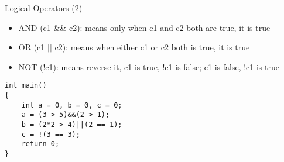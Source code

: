 \begin{frame}[fragile]{Logical Operators (2)}
\begin{itemize}
	\item {AND (c1 \&\& c2): means only when c1 and c2 both are true,  it is true}
	\item {OR (c1 $||$ c2): means when either c1 or c2 both is true,  it is true}
	\item {NOT (!c1): means reverse it, c1 is true, !c1 is false; c1 is false, !c1 is true}
\end{itemize}
\begin{lstlisting}
int main()
{
    int a = 0, b = 0, c = 0;
    a = (3 > 5)&&(2 > 1);
    b = (2*2 > 4)||(2 == 1);
    c = !(3 == 3);
    return 0;
}
\end{lstlisting} 
\end{frame}

